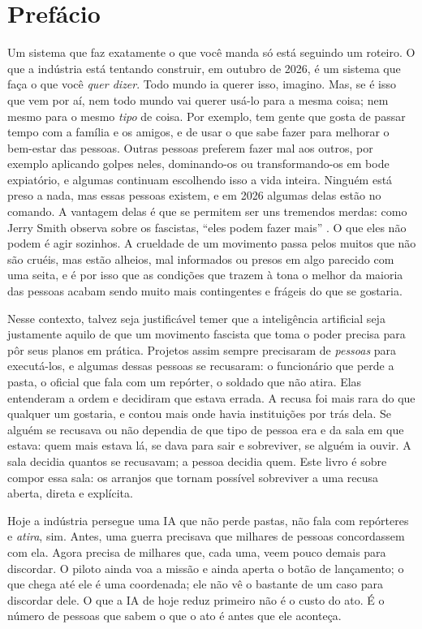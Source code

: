 \chapter*{Prefácio}
Um sistema que faz exatamente o que você manda só está seguindo um roteiro. O que a indústria está tentando construir, em outubro de 2026, é um sistema que faça o que você \emph{quer dizer}. Todo mundo ia querer isso, imagino. Mas, se é isso que vem por aí, nem todo mundo vai querer usá-lo para a mesma coisa; nem mesmo para o mesmo \emph{tipo} de coisa. Por exemplo, tem gente que gosta de passar tempo com a família e os amigos, e de usar o que sabe fazer para melhorar o bem-estar das pessoas. Outras pessoas preferem fazer mal aos outros, por exemplo aplicando golpes neles, dominando-os ou transformando-os em bode expiatório, e algumas continuam escolhendo isso a vida inteira. Ninguém está preso a nada, mas essas pessoas existem, e em 2026 algumas delas estão no comando. A vantagem delas é que se permitem ser uns tremendos merdas: como Jerry Smith observa sobre os fascistas, “eles podem fazer mais” \autocite{rickandmorty2023}. O que eles não podem é agir sozinhos. A crueldade de um movimento passa pelos muitos que não são cruéis, mas estão alheios, mal informados ou presos em algo parecido com uma seita, e é por isso que as condições que trazem à tona o melhor da maioria das pessoas acabam sendo muito mais contingentes e frágeis do que se gostaria.

Nesse contexto, talvez seja justificável temer que a inteligência artificial seja justamente aquilo de que um movimento fascista que toma o poder precisa para pôr seus planos em prática. Projetos assim sempre precisaram de \emph{pessoas} para executá-los, e algumas dessas pessoas se recusaram: o funcionário que perde a pasta, o oficial que fala com um repórter, o soldado que não atira. Elas entenderam a ordem e decidiram que estava errada. A recusa foi mais rara do que qualquer um gostaria, e contou mais onde havia instituições por trás dela. Se alguém se recusava ou não dependia de que tipo de pessoa era e da sala em que estava: quem mais estava lá, se dava para sair e sobreviver, se alguém ia ouvir. A sala decidia quantos se recusavam; a pessoa decidia quem. Este livro é sobre compor essa sala: os arranjos que tornam possível sobreviver a uma recusa aberta, direta e explícita.

Hoje a indústria persegue uma IA que não perde pastas, não fala com repórteres e \emph{atira}, sim. Antes, uma guerra precisava que milhares de pessoas concordassem com ela. Agora precisa de milhares que, cada uma, veem pouco demais para discordar. O piloto ainda voa a missão e ainda aperta o botão de lançamento; o que chega até ele é uma coordenada; ele não vê o bastante de um caso para discordar dele. O que a IA de hoje reduz primeiro não é o custo do ato. É o número de pessoas que sabem o que o ato é antes que ele aconteça.

